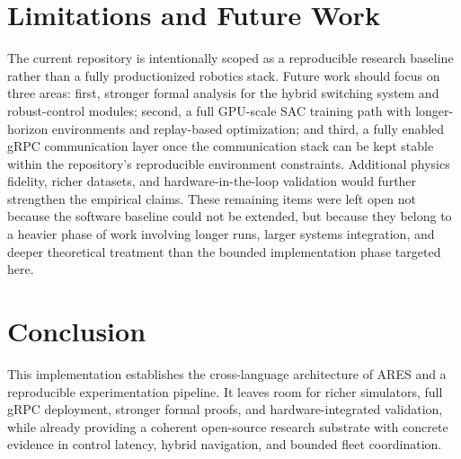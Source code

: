 \documentclass[letterpaper, 10 pt, conference]{ieeeconf}
\begin{document}
\section{Limitations and Future Work}
The current repository is intentionally scoped as a reproducible research
baseline rather than a fully productionized robotics stack. Future work should
focus on three areas: first, stronger formal analysis for the hybrid switching
system and robust-control modules; second, a full GPU-scale SAC training path
with longer-horizon environments and replay-based optimization; and third, a
fully enabled gRPC communication layer once the communication stack can be kept
stable within the repository's reproducible environment constraints. Additional
physics fidelity, richer datasets, and hardware-in-the-loop validation would
further strengthen the empirical claims. These remaining items were left open
not because the software baseline could not be extended, but because they
belong to a heavier phase of work involving longer runs, larger systems
integration, and deeper theoretical treatment than the bounded implementation
phase targeted here.

\section{Conclusion}
This implementation establishes the cross-language architecture of ARES and a
reproducible experimentation pipeline. It leaves room for richer simulators,
full gRPC deployment, stronger formal proofs, and hardware-integrated
validation, while already providing a coherent open-source research substrate
with concrete evidence in control latency, hybrid navigation, and bounded fleet
coordination.


\end{document}
